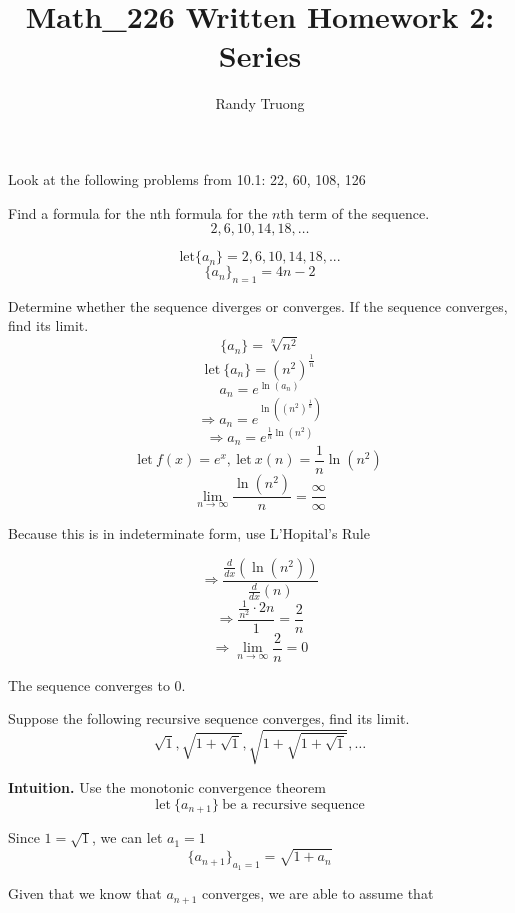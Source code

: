 \documentclass{article}
\title{Math\_226 Written Homework 2: Series}
\author{Randy Truong}
\newenvironment{problem}[2][Problem]{\begin{trivlist}
\item[\hskip \labelsep {\bfseries #1}\hskip \labelsep {\bfseries #2.}]}{\end{trivlist}}
\begin{document}
\maketitle
\begin{problem}{1.1}
  Look at the following problems from 10.1: 22, 60, 108, 126
\end{problem}
\begin{problem}{1.1.1 (Problem 22)}
  Find a formula for the nth formula for the $n$th term
  of the sequence.
  \[ 2, 6, 10, 14, 18, \dots\]
\end{problem}
\[ \textrm{let} \{a_{n}\} = {2,6,10,14,18,...}\]
\[ \{a_{n}\}_{n=1} = 4n-2\]
\begin{problem}{1.1.2 (Problem 60)}
  Determine whether the sequence diverges or converges. If the
  sequence converges, find its limit.
  \[ \{a_{n}\} = \sqrt[n]{n^{2}}\]
  \[ \textrm{let}~ \{a_{n}\} = (n^{2})^{\frac{1}{n}}\]
  \[ a_{n} = e^{\ln(a_{n})}\]
  \[ \Rightarrow a_{n} = e^{\ln((n^{2})^{\frac{1}{n}})}\]
  \[ \Rightarrow a_{n} = e^{\frac{1}{n}\ln(n^{2})}\]
  \[ \textrm{let} ~ f(x) = e^{x}, ~ \textrm{let} ~ x(n) = \frac{1}{n}\ln({n^{2}})\]
  \[ \lim_{n \rightarrow \infty}\frac{\ln(n^{2})}{n} = \frac{\infty}{\infty} \]
  \begin{center}
    Because this is in indeterminate form, use L'Hopital's Rule
  \end{center}
  \[ \Rightarrow \frac{\frac{d}{dx} (\ln(n^{2}))}{\frac{d}{dx}(n)}\]
  \[ \Rightarrow \frac{\frac{1}{n^{2}} \cdot 2n}{1} = \frac{2}{n}\]
  \[ \Rightarrow \lim_{n \rightarrow \infty} \frac{2}{n} = 0 \]
  \begin{center}
    The sequence converges to 0.
  \end{center}

\end{problem}
\begin{problem}{1.1.3 (Problem 108)}
  Suppose the following recursive sequence converges,
  find its limit.
  \[ \sqrt{1},\sqrt{1+\sqrt{1}}, \sqrt{1+\sqrt{1+\sqrt{1}}}, \dots\]
\end{problem}
\textbf{Intuition.} Use the monotonic convergence theorem
\[ \textrm{let} ~ \{a_{n+1}\} ~ \textrm{be a recursive sequence}\]

\begin{center}
  Since $ 1 = \sqrt{1}$, we can let $ a_{1} = 1 $
  \[ \{ a_{n+1}\}_{a_{1} = 1} = \sqrt{1+a_{n}}\]
\end{center}
Given that we know that $ a_{n+1} $ converges, we are
able to assume that
\end{document}
